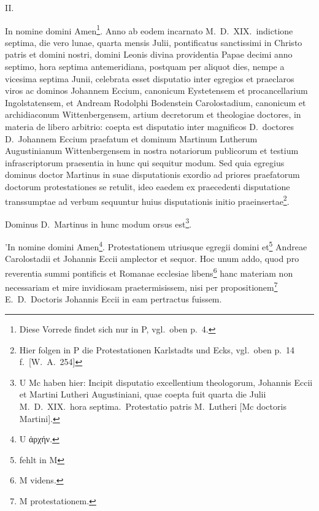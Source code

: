 II.

In nomine domini Amen\footnote{Diese Vorrede findet sich nur in P, vgl.\ oben p.\ 4.}. Anno ab eodem incarnato M.\ D.\ XIX.\ indictione septima, die vero lunae, quarta mensis Julii, pontificatus sanctissimi in Christo patris et domini nostri, domini Leonis divina providentia Papae decimi anno septimo, hora septima antemeridiana, postquam per aliquot dies, nempe a vicesima septima Junii, celebrata esset disputatio inter egregios et praeclaros viros ac dominos Johannem Eccium, canonicum Eystetensem et procancellarium Ingolstatensem, et Andream Rodolphi Bodenstein Carolostadium, canonicum et archidiaconum Wittenbergensem, artium decretorum et theologiae doctores, in materia de libero arbitrio: coepta est disputatio inter magnificos D.\ doctores D.\ Johannem Eccium praefatum et dominum Martinum Lutherum Augustinianum Wittenbergensem in nostra notariorum publicorum et testium infrascriptorum praesentia in hunc qui sequitur modum. Sed quia egregius dominus doctor Martinus in suae disputationis exordio ad priores praefatorum doctorum protestationes se retulit, ideo eaedem ex praecedenti disputatione transsumptae ad verbum sequuntur huius disputationis initio praeinsertae\footnote{Hier folgen in P die Protestationen Karlstadts und Ecks, vgl.\ oben p.\ 14 f.\ [W.\ A.\ 254]}.

Dominus D.\ Martinus in hunc modum orsus est\footnote{U Mc haben hier: Incipit disputatio excellentium theologorum, Johannis Eccii et Martini Lutheri Augustiniani, quae coepta fuit quarta die Julii M.\ D.\ XIX.\ hora septima.\ Protestatio patris M.\ Lutheri [Mc doctoris Martini].}.

'In nomine domini Amen\footnote{U ἀρχήν.}. Protestationem utriusque egregii domini et\footnote{fehlt in M} Andreae Carolostadii et Johannis Eccii amplector et sequor. Hoc unum addo, quod pro reverentia summi pontificis et Romanae ecclesiae libens\footnote{M videns.} hanc materiam non necessariam et mire invidiosam praetermisissem, nisi per propositionem\footnote{M protestationem.} E.\ D.\ Doctoris Johannis Eccii in eam pertractus fuissem.
